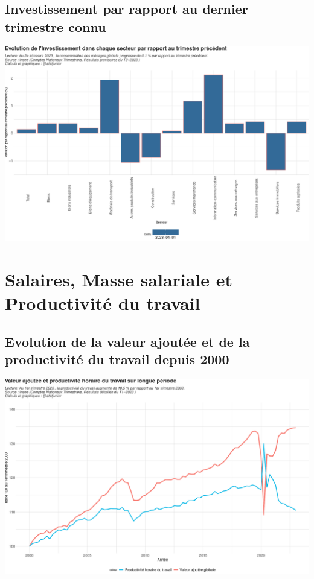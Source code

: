 \documentclass[
  paper=a4,
  ,captions=tableheading
]{scrartcl}
\begin{document}
\hypertarget{investissement-par-rapport-au-dernier-trimestre-connu}{%
\subsection{Investissement par rapport au dernier trimestre
connu}\label{investissement-par-rapport-au-dernier-trimestre-connu}}

\includegraphics{rapport_pdf_compte_branche_files/figure-latex/unnamed-chunk-16-1.pdf}

\newpage

\hypertarget{salaires-masse-salariale-et-productivituxe9-du-travail}{%
\section{Salaires, Masse salariale et Productivité du
travail}\label{salaires-masse-salariale-et-productivituxe9-du-travail}}

\hypertarget{evolution-de-la-valeur-ajoutuxe9e-et-de-la-productivituxe9-du-travail-depuis-2000}{%
\subsection{Evolution de la valeur ajoutée et de la productivité du
travail depuis
2000}\label{evolution-de-la-valeur-ajoutuxe9e-et-de-la-productivituxe9-du-travail-depuis-2000}}

\includegraphics{rapport_pdf_compte_branche_files/figure-latex/unnamed-chunk-17-1.pdf}
\end{document}
